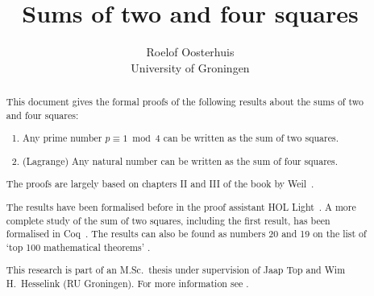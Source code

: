 \documentclass[11pt,a4paper,twoside]{article}
\begin{document}
\title{Sums of two and four squares}
\author{Roelof Oosterhuis\\University of Groningen}
\maketitle

\begin{abstract}
This document gives the formal proofs of the following results about the sums of two and four squares:
\begin{enumerate}
\item Any prime number $p \equiv 1 \bmod 4$ can be written as the sum of two squares.
\item (Lagrange) Any natural number can be written as the sum of four squares.
\end{enumerate}
The proofs are largely based on chapters II and III of the book by
Weil~\cite{Weil}.

The results %
have been formalised before in the proof assistant HOL Light~\cite{HOLLight}. A more complete study of the sum of two squares, including the first result, has been formalised in Coq~\cite{Thery}.
The results can also be found as numbers 20 and 19 on the list of `top 100 mathematical theorems' \cite{Wiedijk100}.

This research is part of an M.Sc.~thesis under supervision of Jaap Top
and Wim H.~Hesselink (RU Groningen). For more information see
\cite{Oosterhuis-MSc}.
\end{abstract}
\thispagestyle{empty}
\clearpage

\tableofcontents
{}






\end{document}
